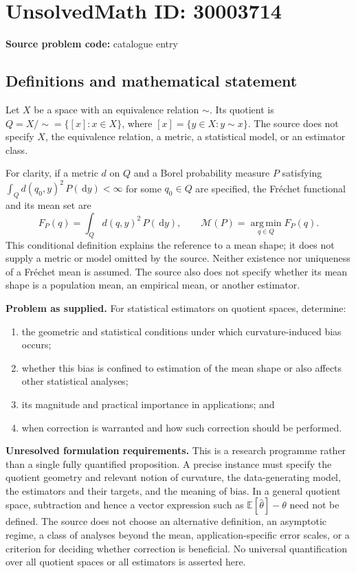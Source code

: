 \documentclass[11pt]{article}
\newcommand{\dd}{\,\mathrm{d}}
\begin{document}
\section*{UnsolvedMath ID: 30003714}
\textbf{Source problem code:} catalogue entry
\subsection{Definitions and mathematical statement}
Let \(X\) be a space with an equivalence relation \(\sim\). Its quotient is \(Q=X/{\sim}=\{[x]:x\in X\}\), where \([x]=\{y\in X:y\sim x\}\). The source does not specify \(X\), the equivalence relation, a metric, a statistical model, or an estimator class.

For clarity, if a metric \(d\) on \(Q\) and a Borel probability measure \(P\) satisfying \(\int_Q d(q_0,y)^2\,P(\dd y)<\infty\) for some \(q_0\in Q\) are specified, the Fr\'echet functional and its mean set are
\[
F_P(q)=\int_Q d(q,y)^2\,P(\dd y),\qquad
\mathcal M(P)=\operatorname*{arg\,min}_{q\in Q}F_P(q).
\]
This conditional definition explains the reference to a mean shape; it does not supply a metric or model omitted by the source. Neither existence nor uniqueness of a Fr\'echet mean is assumed. The source also does not specify whether its mean shape is a population mean, an empirical mean, or another estimator.

\textbf{Problem as supplied.} For statistical estimators on quotient spaces, determine:
\begin{enumerate}
\item the geometric and statistical conditions under which curvature-induced bias occurs;
\item whether this bias is confined to estimation of the mean shape or also affects other statistical analyses;
\item its magnitude and practical importance in applications; and
\item when correction is warranted and how such correction should be performed.
\end{enumerate}

\textbf{Unresolved formulation requirements.} This is a research programme rather than a single fully quantified proposition. A precise instance must specify the quotient geometry and relevant notion of curvature, the data-generating model, the estimators and their targets, and the meaning of bias. In a general quotient space, subtraction and hence a vector expression such as \(\mathbb E[\widehat\theta]-\theta\) need not be defined. The source does not choose an alternative definition, an asymptotic regime, a class of analyses beyond the mean, application-specific error scales, or a criterion for deciding whether correction is beneficial. No universal quantification over all quotient spaces or all estimators is asserted here.
\end{document}
